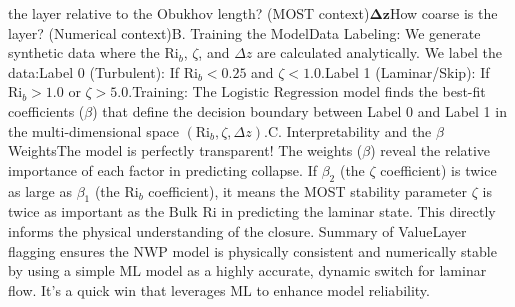 the layer relative to the $\text{Obukhov}$ length? (MOST context)$\mathbf{\Delta z}$How coarse is the layer? (Numerical context)B. Training the ModelData Labeling: We generate synthetic data where the $\text{Ri}_b$, $\zeta$, and $\Delta z$ are calculated analytically. We label the data:Label 0 (Turbulent): If $\text{Ri}_b < 0.25$ and $\zeta < 1.0$.Label 1 (Laminar/Skip): If $\text{Ri}_b > 1.0$ or $\zeta > 5.0$.Training: The $\text{Logistic Regression}$ model finds the best-fit coefficients ($\beta$) that define the decision boundary between Label 0 and Label 1 in the multi-dimensional space $(\text{Ri}_b, \zeta, \Delta z)$.C. Interpretability and the $\beta$ WeightsThe model is perfectly transparent! The weights ($\beta$) reveal the relative importance of each factor in predicting collapse. If $\beta_2$ (the $\zeta$ coefficient) is twice as large as $\beta_1$ (the $\text{Ri}_b$ coefficient), it means the MOST stability parameter $\zeta$ is twice as important as the $\text{Bulk Ri}$ in predicting the laminar state. This directly informs the physical understanding of the closure. Summary of ValueLayer flagging ensures the $\text{NWP}$ model is physically consistent and numerically stable by using a simple $\text{ML}$ model as a highly accurate, dynamic switch for laminar flow. It's a quick win that leverages $\text{ML}$ to enhance model reliability.